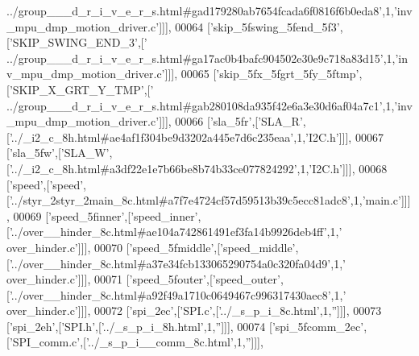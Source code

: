 \begin{DoxyCode}
{      ../group\_\_\_d\_r\_i\_v\_e\_r\_s.html#gad179280ab7654fcada6f0816f6b0eda8'},1,\textcolor{stringliteral}{'inv\_mpu\_dmp\_motion\_driver.c'}]]],
00064   [\textcolor{stringliteral}{'skip\_5fswing\_5fend\_5f3'},[\textcolor{stringliteral}{'SKIP\_SWING\_END\_3'},[\textcolor{stringliteral}{'
      ../group\_\_\_d\_r\_i\_v\_e\_r\_s.html#ga17ac0b4bafc904502e30e9c718a83d15'},1,\textcolor{stringliteral}{'inv\_mpu\_dmp\_motion\_driver.c'}]]],
00065   [\textcolor{stringliteral}{'skip\_5fx\_5fgrt\_5fy\_5ftmp'},[\textcolor{stringliteral}{'SKIP\_X\_GRT\_Y\_TMP'},[\textcolor{stringliteral}{'
      ../group\_\_\_d\_r\_i\_v\_e\_r\_s.html#gab280108da935f42e6a3e30d6af04a7c1'},1,\textcolor{stringliteral}{'inv\_mpu\_dmp\_motion\_driver.c'}]]],
00066   [\textcolor{stringliteral}{'sla\_5fr'},[\textcolor{stringliteral}{'SLA\_R'},[\textcolor{stringliteral}{'../\_i2\_c\_8h.html#ae4af1f304be9d3202a445e7d6c235eaa'},1,\textcolor{stringliteral}{'I2C.h'}]]],
00067   [\textcolor{stringliteral}{'sla\_5fw'},[\textcolor{stringliteral}{'SLA\_W'},[\textcolor{stringliteral}{'../\_i2\_c\_8h.html#a3df22e1e7b66be8b74b33ce077824292'},1,\textcolor{stringliteral}{'I2C.h'}]]],
00068   [\textcolor{stringliteral}{'speed'},[\textcolor{stringliteral}{'speed'},[\textcolor{stringliteral}{'../styr\_2styr\_2main\_8c.html#a7f7e4724cf57d59513b39c5ecc81adc8'},1,\textcolor{stringliteral}{'main.c'}]]],
00069   [\textcolor{stringliteral}{'speed\_5finner'},[\textcolor{stringliteral}{'speed\_inner'},[\textcolor{stringliteral}{'../over\_\_hinder\_8c.html#ae104a742861491ef3fa14b9926deb4ff'},1,\textcolor{stringliteral}{'
      over\_hinder.c'}]]],
00070   [\textcolor{stringliteral}{'speed\_5fmiddle'},[\textcolor{stringliteral}{'speed\_middle'},[\textcolor{stringliteral}{'../over\_\_hinder\_8c.html#a37e34fcb133065290754a0c320fa04d9'},1,\textcolor{stringliteral}{'
      over\_hinder.c'}]]],
00071   [\textcolor{stringliteral}{'speed\_5fouter'},[\textcolor{stringliteral}{'speed\_outer'},[\textcolor{stringliteral}{'../over\_\_hinder\_8c.html#a92f49a1710c0649467c996317430aec8'},1,\textcolor{stringliteral}{'
      over\_hinder.c'}]]],
00072   [\textcolor{stringliteral}{'spi\_2ec'},[\textcolor{stringliteral}{'SPI.c'},[\textcolor{stringliteral}{'../\_s\_p\_i\_8c.html'},1,\textcolor{stringliteral}{''}]]],
00073   [\textcolor{stringliteral}{'spi\_2eh'},[\textcolor{stringliteral}{'SPI.h'},[\textcolor{stringliteral}{'../\_s\_p\_i\_8h.html'},1,\textcolor{stringliteral}{''}]]],
00074   [\textcolor{stringliteral}{'spi\_5fcomm\_2ec'},[\textcolor{stringliteral}{'SPI\_comm.c'},[\textcolor{stringliteral}{'../\_s\_p\_i\_\_comm\_8c.html'},1,\textcolor{stringliteral}{''}]]],

\end{DoxyCode}
